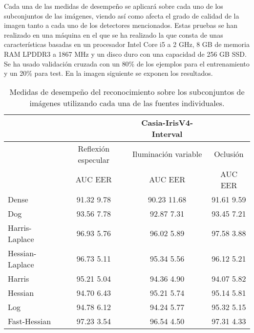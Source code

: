 Cada una de las medidas de desempeño se aplicará sobre cada uno de los subconjuntos de las imágenes, viendo así como afecta el grado de calidad de la imagen tanto a cada uno de los detectores mencionados. Estas pruebas se han realizado en una máquina en el que se ha realizado la que consta de unas características basadas en un procesador Intel Core i5 a 2 GHz, 8 GB  de memoria RAM LPDDR3 a 1867 MHz y un disco duro con una capacidad de 256 GB SSD. \\

Se ha usado validación cruzada con un 80\% de los ejemplos para el entrenamiento y un 20\% para test. En la imagen siguiente se exponen los resultados. \\

\begin{table}[h]
\begin{center}
\begin{tabular}{@{}lccc@{}}
\toprule
&& Casia-IrisV4-Interval & \\ \hline
&Reflexión especular		&  	Iluminación variable		& Oclusión \\ \hline
&AUC  \phantom{aa} EER  &  	AUC  \phantom{aa} EER 	& AUC  \phantom{aa} EER  \\ \hline
Dense& 91.32 \phantom{aa} 9.78   &  	90.23 \phantom{aa} 11.68  & 91.61 \phantom{aa} 9.59  \\
Dog& 93.56 \phantom{aa} 7.78   &  	92.87 \phantom{aa} 7.31  & 93.45 \phantom{aa} 7.21  \\
Harris-Laplace& 96.93 \phantom{aa} 5.76   &  	96.02 \phantom{aa} 5.89  & 97.58 \phantom{aa} 3.88  \\
Hessian-Laplace& 96.73 \phantom{aa} 5.11   &  95.34 \phantom{aa} 5.56 & 96.12 \phantom{aa} 5.21  \\
Harris& 95.21  \phantom{aa}5.04  &  	94.36 \phantom{aa} 4.90  & 94.07  \phantom{aa}5.82  \\
Hessian& 94.70 \phantom{aa} 6.43   &  95.21 \phantom{aa} 5.74  & 95.14 \phantom{aa} 5.81  \\
Log& 94.78 \phantom{aa} 6.12  &  94.24  \phantom{aa}5.77 & 95.32 \phantom{aa} 5.15   \\ 
Fast-Hessian& 97.23 \phantom{aa} 3.54   &  	96.54 \phantom{aa} 4.50  & 97.31 \phantom{aa} 4.33  \\

\end{tabular}
\end{center}
\caption{Medidas de desempeño del reconocimiento sobre los subconjuntos de imágenes utilizando cada una de las fuentes individuales.}
\label{my_tabla}
\end{table}


